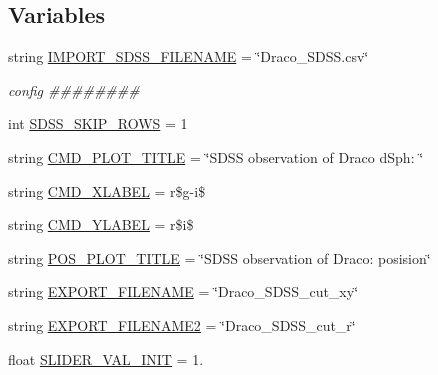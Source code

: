 \subsection*{Variables}
\begin{DoxyCompactItemize}
\item 
string \hyperlink{namespaceplot__Draco__SDSS__CMD__CMcut_a831c14a92a01b5c37b46393599122c71}{I\+M\+P\+O\+R\+T\+\_\+\+S\+D\+S\+S\+\_\+\+F\+I\+L\+E\+N\+A\+ME} = \char`\"{}Draco\+\_\+\+S\+D\+S\+S.\+csv\char`\"{}
\begin{DoxyCompactList}\small\item\em config \#\#\#\#\#\#\#\# \end{DoxyCompactList}\item 
int \hyperlink{namespaceplot__Draco__SDSS__CMD__CMcut_a77aba141d44a10aa841629c09bb35e86}{S\+D\+S\+S\+\_\+\+S\+K\+I\+P\+\_\+\+R\+O\+WS} = 1
\item 
string \hyperlink{namespaceplot__Draco__SDSS__CMD__CMcut_a996b3f27526961cb17360979dbd83065}{C\+M\+D\+\_\+\+P\+L\+O\+T\+\_\+\+T\+I\+T\+LE} = \char`\"{}S\+D\+SS observation of Draco d\+Sph\+: \char`\"{}
\item 
string \hyperlink{namespaceplot__Draco__SDSS__CMD__CMcut_a75199ff0e31b3fc91f5996aecfd3ca0d}{C\+M\+D\+\_\+\+X\+L\+A\+B\+EL} = r\textquotesingle{}\$\hyperlink{namespaceplot__Draco__SDSS__CMD__CMcut_aceb46f1cb6f920499740eb236853cc92}{g}-\/i\$\textquotesingle{}
\item 
string \hyperlink{namespaceplot__Draco__SDSS__CMD__CMcut_a06c22ec66e214aef5832a6f72c5d38c5}{C\+M\+D\+\_\+\+Y\+L\+A\+B\+EL} = r\textquotesingle{}\$i\$\textquotesingle{}
\item 
string \hyperlink{namespaceplot__Draco__SDSS__CMD__CMcut_a3d7fd8c96e93e5e89286d2e3100d11a5}{P\+O\+S\+\_\+\+P\+L\+O\+T\+\_\+\+T\+I\+T\+LE} = \char`\"{}S\+D\+SS observation of Draco\+: posision\char`\"{}
\item 
string \hyperlink{namespaceplot__Draco__SDSS__CMD__CMcut_a0877c5445ed6ac5439ad65bc5deb180d}{E\+X\+P\+O\+R\+T\+\_\+\+F\+I\+L\+E\+N\+A\+ME} = \char`\"{}Draco\+\_\+\+S\+D\+S\+S\+\_\+cut\+\_\+xy\char`\"{}
\item 
string \hyperlink{namespaceplot__Draco__SDSS__CMD__CMcut_ad74a8e00dd2665b433264ecbf8a7a7f5}{E\+X\+P\+O\+R\+T\+\_\+\+F\+I\+L\+E\+N\+A\+M\+E2} = \char`\"{}Draco\+\_\+\+S\+D\+S\+S\+\_\+cut\+\_\+r\char`\"{}
\item 
float \hyperlink{namespaceplot__Draco__SDSS__CMD__CMcut_a47a66344d34ddb1e3eadf4fcb3d12021}{S\+L\+I\+D\+E\+R\+\_\+\+V\+A\+L\+\_\+\+I\+N\+IT} = 1.

\end{DoxyCompactItemize}
